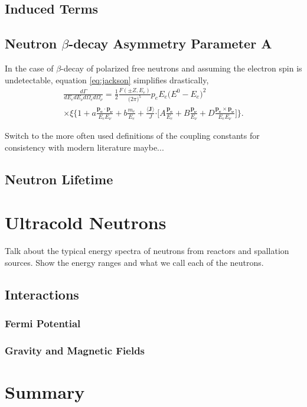 \subsection{Induced Terms}



\subsection{Neutron $\beta$-decay Asymmetry Parameter A}

In the case of $\beta$-decay of polarized free neutrons and assuming the electron spin is undetectable,
equation \ref{eq:jackson} simplifies drastically,
%
\begin{multline}
  \frac{d\Gamma}{dE_e dE_\nu d\Omega_e d\Omega_\nu} = \frac{1}{2} \frac{F(\pm Z, E_e)}{\big( 2\pi \big)^5}
  p_e E_e \big( E^0 - E_e \big)^2 \\ \times \xi 
  \Bigg\{ 1 + a\frac{\boldsymbol{p_e \cdot p_\nu}}{E_e E_\nu} + b\frac{m_e}{E_e} 
  + \frac{\boldsymbol{\langle J \rangle}}{J} \boldsymbol{\cdot} \Bigg[ A\frac{\boldsymbol{p_e}}{E_e}
    + B\frac{\boldsymbol{p_\nu}}{E_\nu} + D\frac{\boldsymbol{p_e \times p_\nu}}{E_e E_\nu}\Bigg]
  \Bigg\}.
  \label{eq:jacksonSimple}
\end{multline}
%

Switch to the more often used definitions of the coupling constants for consistency with modern literature
maybe...

\subsection{Neutron Lifetime}



\section{Ultracold Neutrons}

Talk about the typical energy spectra of neutrons from reactors and spallation sources. Show the
energy ranges and what we call each of the neutrons.

\subsection{Interactions}

\subsubsection{Fermi Potential}

\subsubsection{Gravity and Magnetic Fields}

\section{Summary}



